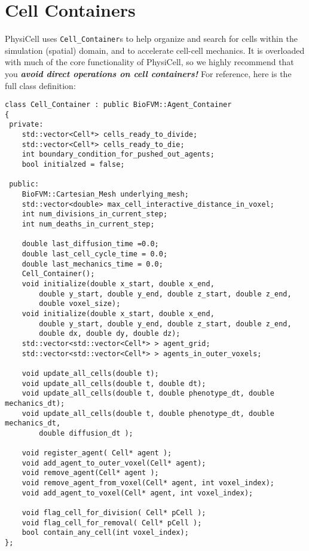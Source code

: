 \documentclass[12pt]{article}
\renewcommand{\v}{\verb}
\begin{document}
\section{Cell Containers}
\label{sec:Cell_Container}
PhysiCell uses \v|Cell_Container|s to help organize and 
search for cells within the simulation (spatial) domain, and to 
accelerate cell-cell mechanics. It is overloaded with much of the 
core functionality of PhysiCell, so we highly recommend that you 
\emph{\textbf{avoid direct operations on cell containers!}}  
For reference, here is the full class definition: 

\begin{verbatim}
class Cell_Container : public BioFVM::Agent_Container
{
 private:    
    std::vector<Cell*> cells_ready_to_divide; 
    std::vector<Cell*> cells_ready_to_die;
    int boundary_condition_for_pushed_out_agents;     
    bool initialzed = false;
    
 public:
    BioFVM::Cartesian_Mesh underlying_mesh;
    std::vector<double> max_cell_interactive_distance_in_voxel;
    int num_divisions_in_current_step;
    int num_deaths_in_current_step;

    double last_diffusion_time =0.0; 
    double last_cell_cycle_time = 0.0;
    double last_mechanics_time = 0.0;
    Cell_Container();
    void initialize(double x_start, double x_end, 
        double y_start, double y_end, double z_start, double z_end, 
        double voxel_size);
    void initialize(double x_start, double x_end, 
        double y_start, double y_end, double z_start, double z_end, 
        double dx, double dy, double dz);
    std::vector<std::vector<Cell*> > agent_grid;
    std::vector<std::vector<Cell*> > agents_in_outer_voxels;
    
    void update_all_cells(double t);
    void update_all_cells(double t, double dt);
    void update_all_cells(double t, double phenotype_dt, double mechanics_dt);
    void update_all_cells(double t, double phenotype_dt, double mechanics_dt,
        double diffusion_dt ); 

    void register_agent( Cell* agent );
    void add_agent_to_outer_voxel(Cell* agent);
    void remove_agent(Cell* agent );
    void remove_agent_from_voxel(Cell* agent, int voxel_index);
    void add_agent_to_voxel(Cell* agent, int voxel_index);
    
    void flag_cell_for_division( Cell* pCell ); 
    void flag_cell_for_removal( Cell* pCell ); 
    bool contain_any_cell(int voxel_index);
};
\end{verbatim}
\end{document}
